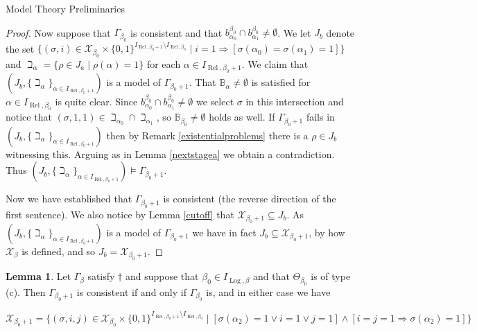\documentclass{amsart}
\theoremstyle{definition}\newtheorem{theorem}{Theorem}
\theoremstyle{definition}\newtheorem{bigtheorem}{Theorem}
\numberwithin{theorem}{section}
\theoremstyle{definition}\newtheorem{corollary}[theorem]{Corollary}
\theoremstyle{definition}\newtheorem{proposition}[theorem]{Proposition}
\theoremstyle{definition}\newtheorem{definition}[theorem]{Definition}
\theoremstyle{definition}\newtheorem{question}[theorem]{Question}
\theoremstyle{definition}\newtheorem{example}[theorem]{Example}
\theoremstyle{definition}\newtheorem{remark}[theorem]{Remark}
\theoremstyle{definition}\newtheorem{note}[theorem]{Note}
\theoremstyle{definition}\newtheorem{lemma}[theorem]{Lemma}
\theoremstyle{definition}\newtheorem{fact}[theorem]{Fact}
\theoremstyle{definition}\newtheorem{define}[theorem]{Definition}
\theoremstyle{definition}\newtheorem{definitions}[theorem]{Definitions}
\theoremstyle{definition}\newtheorem{claim}[theorem]{Claim}
\theoremstyle{definition}\newtheorem{obs}[theorem]{Observation}
\theoremstyle{definition}\newtheorem{construction}[theorem]{Construction}
\newcommand{\B}{\mathbb{B}}
\newcommand{\Rel}{\operatorname{Rel}}
\newcommand{\Log}{\operatorname{Log}}
\newcommand{\X}{\mathcal{X}}
\begin{document}
\begin{section}{Model Theory Preliminaries}
\begin{proof}
Now suppose that $\Gamma_{\beta_0}$ is consistent and that $b_{\alpha_0}^{\beta_0} \cap b_{\alpha_1}^{\beta_0} \neq \emptyset$.  We let $J_b$ denote the set $\{(\sigma, i)\in \X_{\beta_0} \times \{0, 1\}^{I_{\Rel, \beta_0 + 1} \setminus I_{\Rel, \beta_0}}\mid i = 1 \Rightarrow [\sigma(\alpha_0) = \sigma(\alpha_1) = 1]\}$ and $\beth_{\alpha} = \{\rho \in J_a \mid \rho(\alpha) = 1\}$ for each $\alpha \in I_{\Rel, \beta_0 + 1}$.  We claim that $(J_b, \{\beth_{\alpha}\}_{\alpha \in I_{\Rel, \beta_0 + 1}})$ is a model of $\Gamma_{\beta_0 + 1}$.  That $\B_{\alpha} \neq \emptyset$ is satisfied for $\alpha \in I_{\Rel, \beta_0}$ is quite clear.  Since $b_{\alpha_0}^{\beta_0} \cap b_{\alpha_1}^{\beta_0} \neq \emptyset$ we select $\sigma$ in this intersection and notice that $(\sigma, 1, 1) \in \beth_{\alpha_0} \cap \beth_{\alpha_1}$, so $\B_{\beta_0} \neq \emptyset$ holds as well.  If $\Gamma_{\beta_0 + 1}$ fails in $(J_b, \{\beth_{\alpha}\}_{\alpha \in I_{\Rel, \beta_0 + 1}})$ then by Remark \ref{existentialproblems} there is a $\rho \in J_b$ witnessing this.  Arguing as in Lemma \ref{nextstagea} we obtain a contradiction.  Thus $(J_b, \{\beth_{\alpha}\}_{\alpha \in I_{\Rel, \beta_0 + 1}}) \models \Gamma_{\beta_0 + 1}$.

Now we have established that $\Gamma_{\beta_0 + 1}$ is consistent (the reverse direction of the first sentence).  We also notice by Lemma \ref{cutoff} that $\X_{\beta_0 + 1} \subseteq J_b$.  As $(J_b, \{\beth_{\alpha}\}_{\alpha \in I_{\Rel, \beta_0 + 1}})$ is a model of $\Gamma_{\beta_0 + 1}$ we have in fact $J_b \subseteq \X_{\beta_0 + 1}$, by how $\X_{\beta}$ is defined, and so $J_b = \X_{\beta_0 + 1}$.
\end{proof}


\begin{lemma}\label{nextstagec}  Let $\Gamma_{\beta}$ satisfy $\dagger$ and suppose that $\beta_0 \in I_{\Log, \beta}$ and that $\Theta_{\beta_0}$ is of type (c).  Then $\Gamma_{\beta_0 + 1}$ is consistent if and only if $\Gamma_{\beta_0}$ is, and in either case we have 

\begin{center}
$\X_{\beta_0 + 1} = \{(\sigma, i, j)\in \X_{\beta_0} \times \{0, 1\}^{I_{\Rel, \beta_0 + 1} \setminus I_{\Rel, \beta_0}}\mid [\sigma(\alpha_2) = 1 \vee i = 1 \vee j = 1] \wedge [i = j = 1 \Rightarrow \sigma(\alpha_2) = 1]\}$
\end{center}

\end{lemma}


\end{section}
\end{document}
